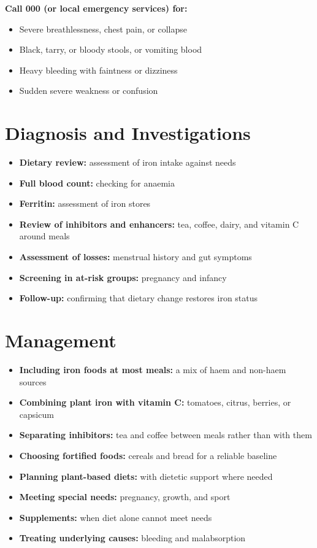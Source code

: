 \textbf{Call 000 (or local emergency services) for:}
\begin{itemize}
    \item Severe breathlessness, chest pain, or collapse
    \item Black, tarry, or bloody stools, or vomiting blood
    \item Heavy bleeding with faintness or dizziness
    \item Sudden severe weakness or confusion
\end{itemize}

\section*{Diagnosis and Investigations}
\begin{itemize}
    \item \textbf{Dietary review:} assessment of iron intake against needs
    \item \textbf{Full blood count:} checking for anaemia
    \item \textbf{Ferritin:} assessment of iron stores
    \item \textbf{Review of inhibitors and enhancers:} tea, coffee, dairy, and vitamin C around meals
    \item \textbf{Assessment of losses:} menstrual history and gut symptoms
    \item \textbf{Screening in at-risk groups:} pregnancy and infancy
    \item \textbf{Follow-up:} confirming that dietary change restores iron status
\end{itemize}

\section*{Management}
\begin{itemize}
    \item \textbf{Including iron foods at most meals:} a mix of haem and non-haem sources
    \item \textbf{Combining plant iron with vitamin C:} tomatoes, citrus, berries, or capsicum
    \item \textbf{Separating inhibitors:} tea and coffee between meals rather than with them
    \item \textbf{Choosing fortified foods:} cereals and bread for a reliable baseline
    \item \textbf{Planning plant-based diets:} with dietetic support where needed
    \item \textbf{Meeting special needs:} pregnancy, growth, and sport
    \item \textbf{Supplements:} when diet alone cannot meet needs
    \item \textbf{Treating underlying causes:} bleeding and malabsorption
\end{itemize}

